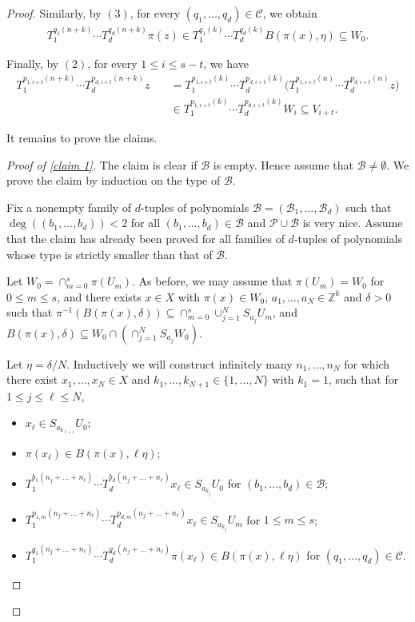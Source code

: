 \documentclass[11pt,reqno]{amsart}
\newcommand{\Z}{\mathbb{Z}}
\newcommand{\cB}{{\mathcal B}}
\newcommand{\cC}{{\mathcal C}}
\newcommand{\cP}{{\mathcal P}}
\theoremstyle{definition}
\theoremstyle{remark}
\begin{document}
\begin{proof}
Similarly, by $(3)$, for every $(q_1,\dots,q_d)\in\cC$, we obtain\begin{align*}
    T_1^{q_1(n+k)}\cdots  T_d^{q_d(n+k)}\pi(z) \in T_1^{q_1(k)} \cdots T_d^{q_d(k)}B(\pi(x),\eta) \subseteq W_0.
\end{align*}

Finally, by $(2)$, for every $1\leq i \leq s-t$, we have\begin{align*}
T_1^{p_{1,i+t}(n+k)}\cdots
 T_d^{p_{d,i+t}(n+k)}z
&\quad =
T_1^{p_{1,i+t}(k)}\cdots
T_d^{p_{d,i+t}(k)} 
\big(T_1^{p_{1,i+t}(n)}\cdots T_d^{p_{d,i+t}(n)}z\big)                                        \\
&\quad \in
T_1^{p_{1,i+t}(k)}\cdots
T_d^{p_{d,i+t}(k)}
W_i   \subseteq V_{i+t}.
\end{align*}

It remains to prove the claims.

\begin{proof}[Proof of \cref{claim 1}]
    The claim is clear if $\cB$ is empty. Hence assume that $\cB\neq\emptyset$. We prove the claim by induction on the type of $\cB$.
    
    Fix a nonempty family of $d$-tuples of polynomials $\cB = (\cB_1,\dots,\cB_d)$ such that $\deg((b_1,\dots,b_d))<2$ for all $(b_1,\dots,b_d)\in \cB$ and $\cP\cup\cB$ is very nice. Assume that the claim has already been proved for all families of $d$-tuples of polynomials whose type is strictly smaller than that of $\cB$.

    Let $W_0 = \cap_{m=0}^{s}\pi(U_m)$. As before, we may assume that $\pi(U_m)=W_0$ for $0\leq m \leq s$, and there exists $x\in X$ with $\pi(x)\in W_0$, $a_1,\dots,a_N\in \Z^{k}$ and $\delta>0$ such that $\pi^{-1}(B(\pi(x),\delta))\subseteq\cap_{m=0}^{s}\cup_{j=1}^{N}S_{a_j}U_m$, and $B(\pi(x),\delta)\subseteq W_0 \cap \left(\cap_{j=1}^{N}S_{a_j}W_0 \right)$.

    Let $\eta=\delta/N$. Inductively we will construct infinitely many $n_1,\dots,n_N$ for which there exist $x_1,\dots,x_N\in X$ and $k_1,\dots,k_{N+1}\in \{1,\dots,N\}$ with $k_1=1$, such that for $1\leq j \leq \ell\leq N$,\begin{itemize}
        \item $x_\ell\in S_{a_{k_{\ell+1}}}U_0$;
        \item $\pi(x_\ell)\in B(\pi(x),\ell\eta)$;
        \item $T_1^{b_1(n_j+\dots+n_\ell)}\cdots T_d^{b_d(n_j+\dots+n_\ell)}x_\ell\in S_{a_{k_j}}U_0$ for $(b_1,\dots,b_d)\in \cB$;
        \item $T_1^{p_{1,m}(n_j+\dots+n_\ell)}\cdots T_d^{p_{d,m}(n_j+\dots+n_\ell)}x_\ell \in S_{a_{k_j}}U_m$ for $1\leq m\leq s$;
        \item $T_1^{q_1(n_j+\dots+n_\ell)}\cdots T_d^{q_d(n_j+\dots+n_\ell)}\pi(x_\ell)\in B(\pi(x),\ell\eta)$ for $(q_1,\dots,q_d)\in \cC$.
    \end{itemize} 


\end{proof}
\end{proof}
\end{document}
